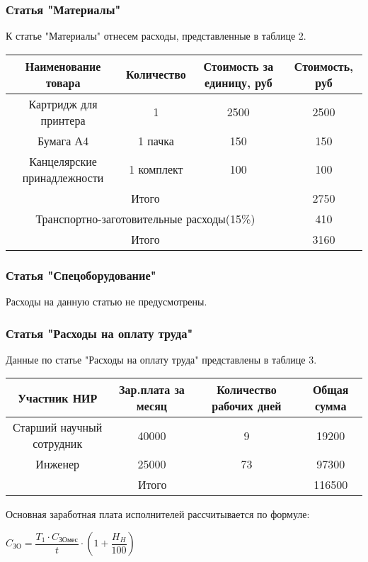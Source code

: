 \subsubsection*{Статья "Материалы"}

К статье "Материалы" отнесем расходы, представленные в таблице 2.

\begin{tabular}{|c|c|c|c|}
  \hline
  Наименование товара & Количество & Стоимость за единицу, руб & Стоимость, руб \\ \hline
  Картридж для принтера & 1 & 2500 & 2500 \\ \hline
  Бумага А4 & 1 пачка & 150 & 150 \\ \hline
  Канцелярские принадлежности & 1 комплект & 100 & 100 \\ \hline
  \multicolumn{3}{|c|}{Итого} & 2750 \\ \hline
  \multicolumn{3}{|c|}{Транспортно-заготовительные расходы(15\%)} & 410 \\ \hline
  \multicolumn{3}{|c|}{Итого} & 3160 \\ \hline
\end{tabular}

\subsubsection*{Статья "Спецоборудование"}
  Расходы на данную статью не предусмотрены.

\subsubsection*{Статья "Расходы на оплату труда"}

Данные по статье "Расходы на оплату труда" представлены в таблице 3.

\begin{tabular}{|c|c|c|c|}
  \hline
  Участник НИР & Зар.плата за месяц & Количество рабочих дней & Общая сумма \\ \hline
  Старший научный сотрудник & 40000 & 9 & 19200 \\ \hline
  Инженер & 25000 & 73 & 97300 \\ \hline
  \multicolumn{3}{|c|}{Итого} & 116500 \\ \hline
\end{tabular}

Основная заработная плата исполнителей рассчитывается по формуле:

\begin{center}
$C_{ЗО} = \dfrac{T_{1} \cdot C_{ЗОмес}}{t} \cdot (1 + \dfrac{H_{H}}{100})$
\end{center}

